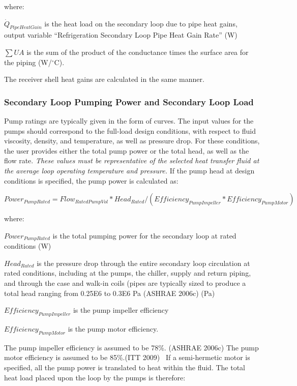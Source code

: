 where:

\({\dot Q_{PipeHeatGain}}\) is the heat load on the secondary loop due to pipe heat gains, output variable ``Refrigeration Secondary Loop Pipe Heat Gain Rate'' (W)

\(\sum U A\) is the sum of the product of the conductance times the surface area for the piping (W/\(^{\circ}\)C).

The receiver shell heat gains are calculated in the same manner.

\subsubsection{Secondary Loop Pumping Power and Secondary Loop Load}\label{secondary-loop-pumping-power-and-secondary-loop-load}

Pump ratings are typically given in the form of curves. The input values for the pumps should correspond to the full-load design conditions, with respect to fluid viscosity, density, and temperature, as well as pressure drop. For these conditions, the user provides either the total pump power or the total head, as well as the flow rate. \emph{These values must be representative of the selected heat transfer fluid at the average loop operating temperature and pressure.} If the pump head at design conditions is specified, the pump power is calculated as:

\begin{equation}
Power_{PumpRated} = Flow_{RatedPumpVol}* Head_{Rated}/ (Efficiency_{PumpImpeller}*Efficiency_{PumpMotor})
\end{equation}

where:

\(Power_{PumpRated}\) is the total pumping power for the secondary loop at rated conditions (W)

\(Head_{Rated}\) is the pressure drop through the entire secondary loop circulation at rated conditions, including at the pumps, the chiller, supply and return piping, and through the case and walk-in coils (pipes are typically sized to produce a total head ranging from 0.25E6 to 0.3E6 Pa (ASHRAE 2006c) (Pa)

\(Efficiency_{PumpImpeller}\) is the pump impeller efficiency

\(Efficiency_{PumpMotor}\) is the pump motor efficiency.

The pump impeller efficiency is assumed to be 78\%. (ASHRAE 2006c) The pump motor efficiency is assumed to be 85\%.(ITT 2009)~ If a semi-hermetic motor is specified, all the pump power is translated to heat within the fluid. The total heat load placed upon the loop by the pumps is therefore:

